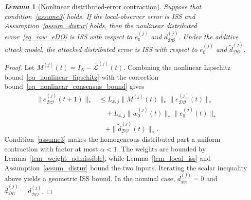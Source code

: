 \documentclass[journal,twoside]{IEEEtran}
\def\L{\mathcal{L}} %
\def\DO{\mathcal{DO}} %
\newtheorem{lemma}{\it Lemma}%
\begin{document}
\begin{lemma}[Nonlinear distributed-error contraction]\label{lem_dist_contraction}
Suppose that condition~\eqref{assume3} holds. If the local-observer error is ISS and Assumption~\ref{assum_distur} holds, then the nonlinear distributed error~\eqref{eq_raw_eDO} is ISS with respect to $e_0^{(j)}$ and $d_{\DO}^{(j)}$. Under the additive attack model, the attacked distributed error is ISS with respect to $e_0^{(j)}$ and $\tilde d_{\DO}^{(j)}$.
\end{lemma}
\begin{proof}
Let $M^{(j)}(t)=I_N-\bar{\L}^{(j)}(t)$. Combining the nonlinear Lipschitz bound~\eqref{eq_nonlinear_lipschitz} with the correction bound~\eqref{eq_nonlinear_consensus_bound} gives
\begin{align*}
\|e_{\DO}^{(j)}(t+1)\|_*
&\le L_{x,j}\|M^{(j)}(t)\|_*\|e_{\DO}^{(j)}(t)\|_*\\
&\quad+L_{x,j}\|w_0^{(j)}(t)\|_*\|e_0^{(j)}(t)\|_*\\
&\quad+\|\tilde d_{\DO}^{(j)}(t)\|_* .
\end{align*}
Condition~\eqref{assume3} makes the homogeneous distributed part a uniform contraction with factor at most $\alpha<1$. The weights are bounded by Lemma~\ref{lem_weight_admissible}, while Lemma~\ref{lem_local_iss} and Assumption~\ref{assum_distur} bound the two inputs. Iterating the scalar inequality above yields a geometric ISS bound. In the nominal case, $d_{\mathrm{att}}^{(j)}=0$ and $\tilde d_{\DO}^{(j)}=d_{\DO}^{(j)}$.
\end{proof}
\end{document}
